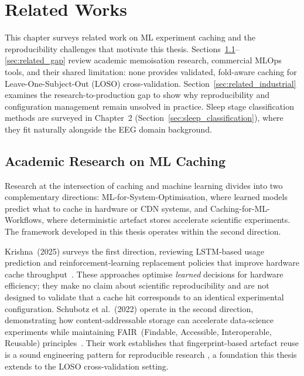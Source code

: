 \chapter{Related Works}

This chapter surveys related work on ML experiment caching and the
reproducibility challenges that motivate this thesis.
Sections~\ref{sec:related_academic}--\ref{sec:related_gap} review
academic memoisation research, commercial MLOps tools, and their shared
limitation: none provides validated, fold-aware caching for
Leave-One-Subject-Out (LOSO) cross-validation.
Section~\ref{sec:related_industrial} examines the research-to-production gap
to show why reproducibility and configuration management remain unsolved in
practice. Sleep stage classification methods are surveyed in
Chapter~2 (Section~\ref{sec:sleep_classification}), where they fit
naturally alongside the EEG domain background.

\section{Academic Research on ML Caching}
\label{sec:related_academic}

Research at the intersection of caching and machine learning divides into two
complementary directions: ML-for-System-Optimisation, where learned
models predict what to cache in hardware or CDN systems, and
Caching-for-ML-Workflows, where deterministic artefact stores
accelerate scientific experiments. The framework developed in this thesis
operates within the second direction.

Krishna~(2025) surveys the first direction, reviewing LSTM-based usage
prediction and reinforcement-learning replacement policies that improve hardware
cache throughput~\cite{krishna2025cache}. These approaches optimise
\textit{learned} decisions for hardware efficiency; they make no claim about
scientific reproducibility and are not designed to validate that a cache hit
corresponds to an identical experimental configuration.
Schubotz et al.\ (2022) operate in the second direction, demonstrating how
content-addressable storage can accelerate data-science experiments while
maintaining FAIR~(Findable, Accessible, Interoperable, Reusable)
principles~\cite{schubotz2022caching}. Their work establishes that
fingerprint-based artefact reuse is a sound engineering pattern for
reproducible research , a foundation this thesis extends to the LOSO
cross-validation setting.


